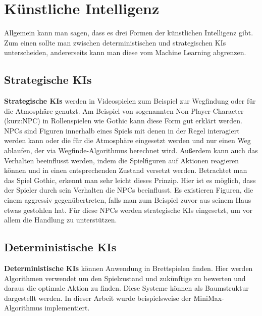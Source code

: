 \section{Künstliche Intelligenz}
\label{ch:Grundlagen:sec:Künstliche Intelligenz}
Allgemein kann man sagen, dass es drei Formen der künstlichen Intelligenz gibt. Zum einen sollte man zwischen deterministischen und strategischen KIs unterscheiden, andererseits kann man diese vom Machine Learning abgrenzen.

\subsection{Strategische KIs}
\label{ch:Grundlagen:sec:strategisch}
\textbf{Strategische KIs} werden in Videospielen zum Beispiel zur Wegfindung oder für die Atmosphäre genutzt. Am Beispiel von sogenannten Non-Player-Character (kurz:NPC) in Rollenspielen wie Gothic kann diese Form  gut erklärt werden. NPCs sind Figuren innerhalb eines Spiels mit denen in der Regel interagiert werden kann oder die für die Atmosphäre eingesetzt werden und nur einen Weg ablaufen, der via Wegfinde-Algorithmus berechnet wird. Außerdem kann auch das Verhalten beeinflusst werden, indem die Spielfiguren auf Aktionen reagieren können und in einen entsprechenden Zustand versetzt werden. Betrachtet man das Spiel Gothic, erkennt man sehr leicht dieses Prinzip. Hier ist es möglich, dass der Spieler durch sein Verhalten die NPCs beeinflusst. Es existieren Figuren, die einem aggressiv gegenübertreten, falls man zum Beispiel zuvor aus seinem Haus etwas gestohlen hat. Für diese NPCs werden strategische KIs eingesetzt, um vor allem die Handlung zu unterstützen.

\subsection{Deterministische KIs}
\label{ch:Grundlagen:sec:deterministisch}
\textbf{Deterministische KIs} können Anwendung in Brettspielen finden. Hier werden Algorithmen verwendet um den Spielzustand und zukünftige zu bewerten und daraus die optimale Aktion zu finden. Diese Systeme können als Baumstruktur dargestellt werden. In dieser Arbeit wurde beispielsweise der MiniMax-Algorithmus implementiert.

